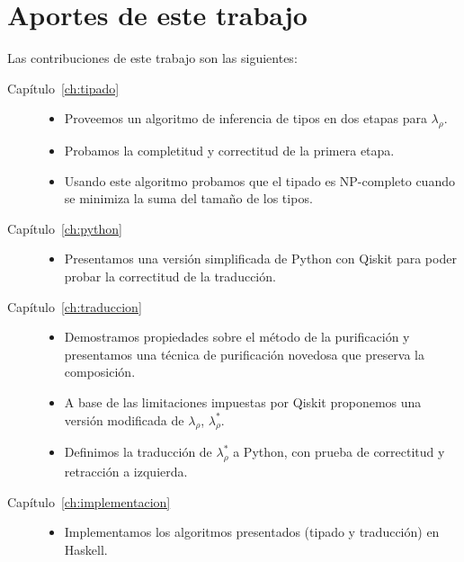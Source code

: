 \section*{Aportes de este trabajo}
Las contribuciones de este trabajo son las siguientes:
\begin{description}
\item[Capítulo~\ref{ch:tipado}] 

    \begin{itemize}
        \item Proveemos un algoritmo de inferencia de tipos en dos etapas para $\lambda_\rho$.
        \item Probamos la completitud y correctitud de la primera etapa.
        \item Usando este algoritmo probamos que el tipado es NP-completo cuando se minimiza la suma del tamaño de los tipos.
    \end{itemize}
\item[Capítulo~\ref{ch:python}] 

    \begin{itemize}
        \item Presentamos una versión simplificada de Python con Qiskit para poder probar la correctitud de la traducción.
    \end{itemize}
\item[Capítulo~\ref{ch:traduccion}] 

    \begin{itemize}
        \item Demostramos propiedades sobre el método de la purificación y presentamos una técnica de purificación novedosa que preserva la composición.
        \item A base de las limitaciones impuestas por Qiskit proponemos una versión modificada de $\lambda_\rho$, $\lambda_\rho^*$.
        \item Definimos la traducción de $\lambda_\rho^*$ a Python, con prueba de correctitud y retracción a izquierda.
    \end{itemize}    
\item[Capítulo~\ref{ch:implementacion}] 

    \begin{itemize}
        \item Implementamos los algoritmos presentados (tipado y traducción) en Haskell.
    \end{itemize}    
\end{description}

